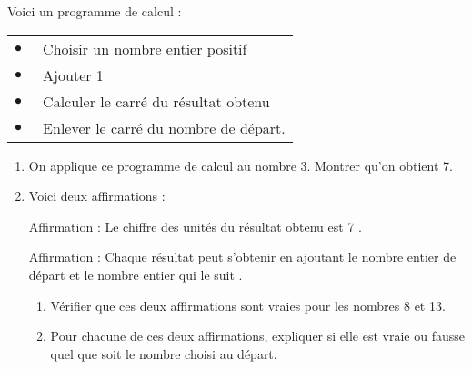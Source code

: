 
\medskip

Voici un programme de calcul : 
\begin{center}
\begin{tabularx}{0.45\linewidth}{|l X|}\hline
$\bullet~~$& Choisir un nombre entier positif\\
$\bullet~~$& Ajouter 1\\
$\bullet~~$& Calculer le carré du résultat obtenu\\
$\bullet~~$& Enlever le carré du nombre de départ.\\ \hline
\end{tabularx}
\end{center}

\begin{enumerate}
\item On applique ce programme de calcul au nombre 3. Montrer qu'on obtient 7.
\item Voici deux affirmations :

Affirmation  : \og Le chiffre des unités du résultat obtenu est 7 \fg.

Affirmation  : \og Chaque résultat peut s'obtenir en ajoutant le nombre entier de départ et le nombre entier qui le suit \fg.
	\begin{enumerate}
		\item Vérifier que ces deux affirmations sont vraies pour les nombres 8 et 13.
		\item Pour chacune de ces deux affirmations, expliquer si elle est vraie ou fausse quel que soit le nombre choisi au départ.
	\end{enumerate}
\end{enumerate}

\bigskip


\bigskip

